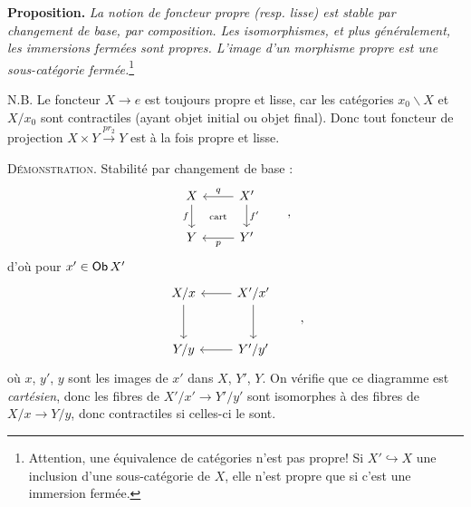 \noindent\textbf{Proposition.} \textit{La notion de foncteur propre (resp. lisse) est stable par changement de base, par composition. Les isomorphismes, et plus généralement, les immersions fermées sont propres. L'image d'un morphisme propre est une sous-catégorie fermée.}\footnote[23]{Attention, une équivalence de catégories n'est pas propre! Si $X' \hookrightarrow X$ une inclusion d'une sous-catégorie de $X$, elle n'est propre que si c'est une immersion fermée.}

\noindent N.B. Le foncteur $X \to e$ est toujours propre et lisse, car les catégories $x_0\backslash X$ et $X/x_0$ sont contractiles (ayant objet initial ou objet final). Donc tout foncteur de projection $X \times Y \xrightarrow{pr_2} Y$ est à la fois propre et lisse.


\noindent{}
\textsc{Démonstration}. Stabilité par changement de base :
\[
\begin{tikzcd}
X \arrow[d, "f"'] \arrow[dr, phantom, "\text{\scriptsize cart}"] & X' \arrow[l, "q"'] \arrow[d, "f'"] \\
Y & Y' \arrow[l, "p"]
\end{tikzcd}
\qquad ,
\]
d'où pour $x' \in \mathsf{Ob}\, X'$
\[
\begin{tikzcd}[row sep=large]
X/x \arrow[d] & X'/x' \arrow[l] \arrow[d] \\
Y/y & Y'/y' \arrow[l]
\end{tikzcd}
\qquad ,
\]
où $x$, $y'$, $y$ sont les images de $x'$ dans $X$, $Y'$, $Y$. On vérifie que ce diagramme est \textit{cartésien}, donc les fibres de $X'/x' \longrightarrow Y'/y'$ sont isomorphes à des fibres de $X/x \longrightarrow Y/y$, donc contractiles si celles-ci le sont.

